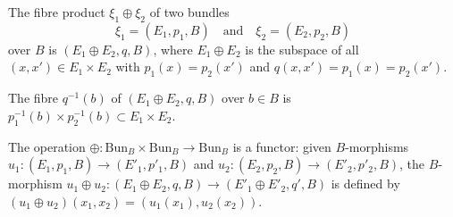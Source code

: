 The fibre product $\xi_1 \oplus \xi_2$ of two bundles
$$\xi_1 = (E_1, p_1, B) \quad \text{and} \quad \xi_2 = (E_2, p_2, B)$$
over $B$ is $(E_1 \oplus E_2, q, B)$, where $E_1 \oplus E_2$ is the subspace of all $(x, x') \in E_1 \times E_2$ with $p_1(x) = p_2(x')$ and $q(x, x') = p_1(x) = p_2(x')$.

The fibre $q^{-1}(b)$ of $(E_1 \oplus E_2, q, B)$ over $b \in B$ is $p_1^{-1}(b) \times p_2^{-1}(b) \subset E_1 \times E_2$.

The operation $\oplus \colon \text{Bun}_B \times \text{Bun}_B \rightarrow \text{Bun}_B$ is a functor: given $B$-morphisms $u_1 \colon (E_1, p_1, B) \rightarrow (E'_1, p'_1, B)$ and $u_2 \colon (E_2, p_2, B) \rightarrow (E'_2, p'_2, B)$, the $B$-morphism $u_1 \oplus u_2 \colon (E_1 \oplus E_2, q, B) \rightarrow (E'_1 \oplus E'_2, q', B)$ is defined by $(u_1 \oplus u_2)(x_1, x_2) = (u_1(x_1), u_2(x_2))$.
